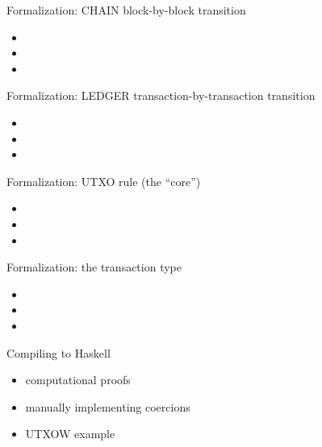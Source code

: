 \documentclass[aspectratio=169]{beamer}
\begin{document}
\begin{frame}{Formalization: CHAIN block-by-block transition}
\begin{itemize}
\item
\item
\item
\end{itemize}
\end{frame}

\begin{frame}{Formalization: LEDGER transaction-by-transaction transition}
\begin{itemize}
\item
\item
\item
\end{itemize}
\end{frame}

\begin{frame}{Formalization: UTXO rule (the ``core'')}
\begin{itemize}
\item
\item
\item
\end{itemize}
\end{frame}

\begin{frame}{Formalization: the transaction type}
\begin{itemize}
\item
\item
\item
\end{itemize}
\end{frame}

\begin{frame}{Compiling to Haskell}
\begin{itemize}
\item computational proofs
\item manually implementing coercions
\item UTXOW example
\end{itemize}
\end{frame}
\end{document}
